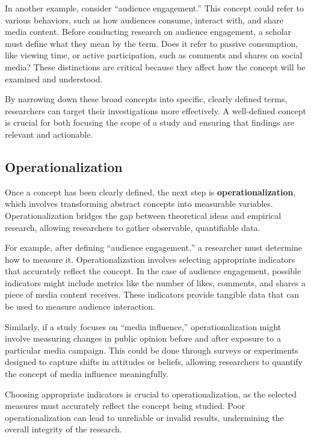 \documentclass[
]{book}
\begin{document}
In another example, consider ``audience engagement.'' This concept could refer to various behaviors, such as how audiences consume, interact with, and share media content. Before conducting research on audience engagement, a scholar must define what they mean by the term. Does it refer to passive consumption, like viewing time, or active participation, such as comments and shares on social media? These distinctions are critical because they affect how the concept will be examined and understood.

By narrowing down these broad concepts into specific, clearly defined terms, researchers can target their investigations more effectively. A well-defined concept is crucial for both focusing the scope of a study and ensuring that findings are relevant and actionable.

\subsection*{Operationalization}\label{operationalization}

Once a concept has been clearly defined, the next step is \textbf{operationalization}, which involves transforming abstract concepts into measurable variables. Operationalization bridges the gap between theoretical ideas and empirical research, allowing researchers to gather observable, quantifiable data.

For example, after defining ``audience engagement,'' a researcher must determine how to measure it. Operationalization involves selecting appropriate indicators that accurately reflect the concept. In the case of audience engagement, possible indicators might include metrics like the number of likes, comments, and shares a piece of media content receives. These indicators provide tangible data that can be used to measure audience interaction.

Similarly, if a study focuses on ``media influence,'' operationalization might involve measuring changes in public opinion before and after exposure to a particular media campaign. This could be done through surveys or experiments designed to capture shifts in attitudes or beliefs, allowing researchers to quantify the concept of media influence meaningfully.

Choosing appropriate indicators is crucial to operationalization, as the selected measures must accurately reflect the concept being studied. Poor operationalization can lead to unreliable or invalid results, undermining the overall integrity of the research.
\end{document}
